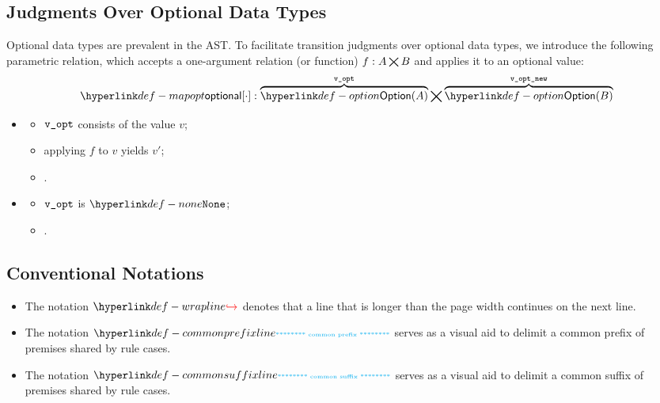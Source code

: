 \subsection{Judgments Over Optional Data Types}
\hypertarget{def-mapopt}{}
Optional data types are prevalent in the AST.
To facilitate transition judgments over optional data types,
we introduce the following parametric relation,
which accepts a one-argument relation (or function) $f : A \bigtimes B$
and applies it to an optional value:
\[
\mapopt{\cdot} : \overname{\Option(A)}{\vvopt} \aslrel \overname{\Option(B)}{\vvoptnew}
\]

\ProseParagraph
\OneApplies
\begin{itemize}
  \item {}
  \begin{itemize}
    \item $\texttt{v\_opt}$ consists of the value $v$;
    \item applying $f$ to $v$ yields $v'$;
    \item {}.
  \end{itemize}

  \item {}
  \begin{itemize}
    \item $\texttt{v\_opt}$ is $\None$;
    \item \Proseeqdef{$\vvoptnew$}{$\None$}.
  \end{itemize}
\end{itemize}

\FormallyParagraph
{}

\subsection{Conventional Notations}
\hypertarget{def-wrapline}{}
\begin{itemize}
\item
The notation $\wrappedline$ denotes that a line that is longer than the page width continues on the next line.

\hypertarget{def-commonprefixline}{}
\item The notation $\commonprefixline$ serves as a visual aid to delimit a common prefix of premises shared by rule cases.

\hypertarget{def-commonsuffixline}{}
\item The notation $\commonsuffixline$ serves as a visual aid to delimit a common suffix of premises shared by rule cases.
\end{itemize}

